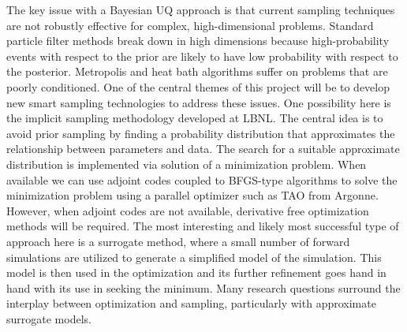 \documentclass[11pt]{article}
\newcommand{\MarginPar}[1]{\marginpar{%
\vskip-\baselineskip %
\raggedright\tiny\sffamily
\hrule\smallskip{\color{red}#1}\par\smallskip\hrule}}
\begin{document}
The key issue with a Bayesian UQ approach is that current sampling techniques
are not robustly effective for complex, high-dimensional problems.
Standard particle filter methods break down in high dimensions because high-probability events 
with respect to the prior are likely to have low probability with respect to the posterior. 
Metropolis and heat bath algorithms suffer on problems that are poorly conditioned.
One of the central themes of this project will be to develop new smart sampling technologies 
to address these issues.
One possibility here is the implicit sampling methodology developed at LBNL.
The central idea is to avoid prior sampling by finding a probability distribution that approximates the
relationship between parameters and data.  The search for a suitable approximate distribution is implemented
via solution of a minimization problem.
When available we can use adjoint codes coupled to BFGS-type algorithms to solve the minimization problem
using a parallel optimizer such as TAO from Argonne.
However, when adjoint codes are not available, derivative free optimization methods will be required.
The most interesting and likely most successful type of approach here is a surrogate method,
where a small number of forward simulations are utilized to generate a simplified model of the simulation.
This model is then used in the optimization and its further refinement goes hand in hand with its use
in seeking the minimum.
Many research questions surround the interplay between optimization and
sampling, particularly with approximate surrogate models.
\end{document}
